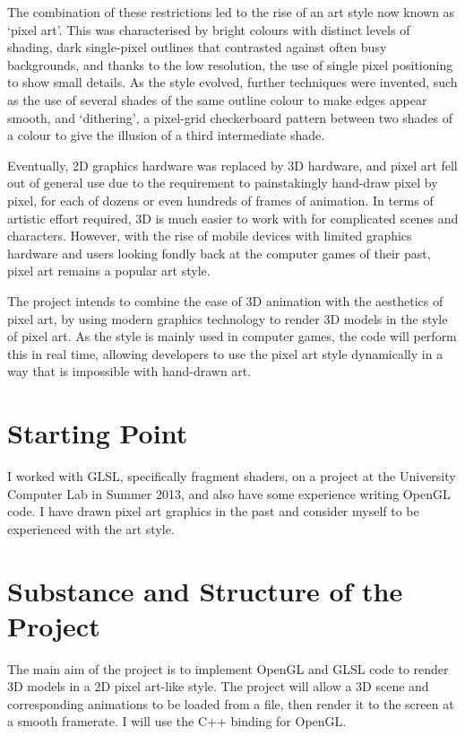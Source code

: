 \documentclass[12pt]{article}
\begin{document}
The combination of these restrictions led to the rise of an art style now known as `pixel art'. This was characterised by bright colours with distinct levels of shading, dark single-pixel outlines that contrasted against often busy backgrounds, and thanks to the low resolution, the use of single pixel positioning to show small details. As the style evolved, further techniques were invented, such as the use of several shades of the same outline colour to make edges appear smooth, and `dithering', a pixel-grid checkerboard pattern between two shades of a colour to give the illusion of a third intermediate shade.

Eventually, 2D graphics hardware was replaced by 3D hardware, and pixel art fell out of general use due to the requirement to painstakingly hand-draw pixel by pixel, for each of dozens or even hundreds of frames of animation. In terms of artistic effort required, 3D is much easier to work with for complicated scenes and characters. However, with the rise of mobile devices with limited graphics hardware and users looking fondly back at the computer games of their past, pixel art remains a popular art style.

The project intends to combine the ease of 3D animation with the aesthetics of pixel art, by using modern graphics technology to render 3D models in the style of pixel art. As the style is mainly used in computer games, the code will perform this in real time, allowing developers to use the pixel art style dynamically in a way that is impossible with hand-drawn art.

\section*{Starting Point}

I worked with GLSL, specifically fragment shaders, on a project at the University Computer Lab in Summer 2013, and also have some experience writing OpenGL code. I have drawn pixel art graphics in the past and consider myself to be experienced with the art style.

\section*{Substance and Structure of the Project}

The main aim of the project is to implement OpenGL and GLSL code to render 3D models in a 2D pixel art-like style. The project will allow a 3D scene and corresponding animations to be loaded from a file, then render it to the screen at a smooth framerate. I will use the C++ binding for OpenGL.
\end{document}
